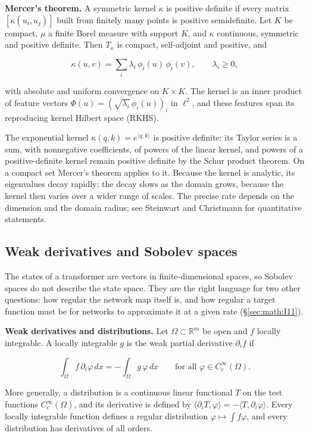 \textbf{Mercer's theorem.} A symmetric kernel \(\kappa\) is positive definite if
every matrix \([\kappa(u_i, u_j)]\) built from finitely many points is
positive semidefinite. Let \(K\) be compact, \(\mu\) a finite Borel measure with
support \(K\), and \(\kappa\) continuous, symmetric and positive definite. Then \(T_\kappa\)
is compact, self-adjoint and positive, and

\[
\kappa(u, v) = \sum_i \lambda_i\, \phi_i(u)\, \phi_i(v), \qquad \lambda_i \ge 0,
\]

with absolute and uniform convergence on \(K \times K\). The kernel is an inner
product of feature vectors \(\Phi(u) = (\sqrt{\lambda_i}\, \phi_i(u))_i\) in \(\ell^{2}\),
and these features span its reproducing kernel Hilbert space (RKHS).

The exponential kernel \(\kappa(q, k) = e^{\langle q,k\rangle}\) is positive definite: its
Taylor series is a sum, with nonnegative coefficients, of powers of the
linear kernel, and powers of a positive-definite kernel remain positive
definite by the Schur product theorem. On a compact set Mercer's theorem
applies to it. Because the kernel is analytic, its eigenvalues decay
rapidly; the decay slows as the domain grows, because the kernel then
varies over a wider range of scales. The precise rate depends on the dimension and the domain
radius; see Steinwart and Christmann for quantitative statements.

\subsection{Weak derivatives and Sobolev
spaces}\label{sec:math:I5}

The states of a transformer are vectors in finite-dimensional spaces, so
Sobolev spaces do not describe the state space. They are the right
language for two other questions: how regular the network map itself is,
and how regular a target function must be for networks to approximate it
at a given rate (\S\ref{sec:math:I11}).

\textbf{Weak derivatives and distributions.} Let \(\Omega \subset \mathbb{R}^{m}\)
be open and \(f\) locally integrable. A locally integrable \(g\) is the weak
partial derivative \(\partial_i f\) if

\[
\int_\Omega f\, \partial_i \varphi \, dx = -\int_\Omega g\, \varphi \, dx \qquad \text{for all } \varphi \in C_c^\infty(\Omega).
\]

More generally, a distribution is a continuous linear functional \(T\) on
the test functions \(C_c^\infty(\Omega)\), and its derivative is defined by
\(\langle \partial_i T, \varphi\rangle = -\langle T, \partial_i \varphi\rangle\). Every locally integrable function defines a
regular distribution \(\varphi \mapsto \int f\varphi\), and every distribution has derivatives of
all orders.

